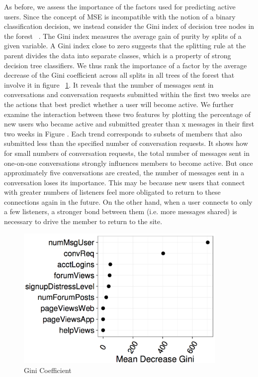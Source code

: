 As before, we assess the importance of the factors used for predicting active users. Since the concept of MSE is incompatible with the notion of a binary classification decision, we instead consider the Gini index  of decision tree nodes in the forest ~\cite{hastie2009unsupervised}. The Gini index measures the average gain of purity by splits of a given variable. A Gini index close to zero suggests that the splitting rule at the parent divides the data into separate classes, which is a property of strong decision tree classifiers. We thus rank the importance of a factor by the average decrease of the Gini coefficient across all splits in all trees of the forest that involve it in figure ~\ref{fig:5.5}. It reveals that the number of messages sent in conversations and conversation requests submitted within the first two weeks are the actions that best predict whether a user will become active. We further examine the interaction between these two features by plotting the percentage of new users who became active and submitted  greater than x messages in their first two weeks in Figure . Each trend corresponds to subsets of members that also submitted less than the specified number of conversation requests. It shows how for small numbers of conversation requests, the total number of messages sent in one-on-one conversations strongly influences members to become active. But once approximately five conversations are created, the number of messages sent in a conversation loses its importance. This may be because new users that connect with greater numbers of listeners feel more obligated to return to these connections again in the future. On the other hand, when a user connects to only a few listeners, a stronger bond between them (i.e. more messages shared) is necessary to drive the member to return to the site.

\begin{figure}
	\centering %
	\includegraphics[width=4in]{Gini.png} %
	\caption{Gini Coefficient} 
	\label{fig:5.5}
\end{figure}

